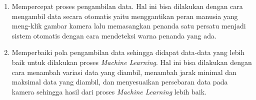 \begin{enumerate}[nolistsep]

  \item Mempercepat proses pengambilan data. Hal ini bisa dilakukan dengan cara mengambil data secara otomatis yaitu menggantikan peran manusia yang meng-klik gambar kamera lalu memasangkan penanda satu persatu menjadi sistem otomatis dengan cara mendeteksi warna penanda yang ada. 

  \item Memperbaiki pola pengambilan data sehingga didapat data-data yang lebih baik untuk dilakukan proses \textit{Machine Learning}. Hal ini bisa dilakukan dengan cara menambah variasi data yang diambil, menambah jarak minimal dan maksimal data yang diambil, dan menyesuaikan persebaran data pada kamera sehingga hasil dari proses \emph{Machine Learning} lebih baik.
\end{enumerate}

